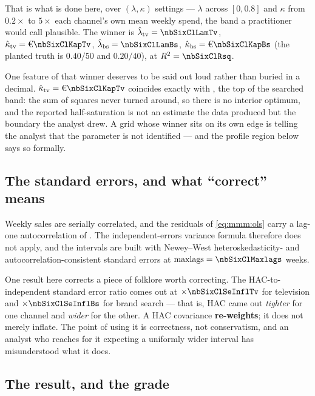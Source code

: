 That is what is done here, over \nbSixClNGrid{} $(\lambda, \kappa)$ settings --- $\lambda$ across
$[0, 0.8]$ and $\kappa$ from $0.2\times$ to $5\times$ each channel's own mean weekly spend, the
band a practitioner would call plausible. The winner is
$\hat\lambda_{\text{tv}} = \nbSixClLamTv$, $\hat\kappa_{\text{tv}} = \eur{\nbSixClKapTv}$,
$\hat\lambda_{\text{bs}} = \nbSixClLamBs$, $\hat\kappa_{\text{bs}} = \eur{\nbSixClKapBs}$
(the planted truth is $0.40 / 50$ and $0.20 / 40$), at $R^2 = \nbSixClRsq$.

One feature of that winner deserves to be said out loud rather than buried in a decimal.
$\hat\kappa_{\text{tv}} = \eur{\nbSixClKapTv}$ coincides exactly with \eur{\nbSixRegKapTvHi}, the
top of the searched band: the sum of squares never turned around, so there is no interior optimum,
and the reported half-saturation is not an estimate the data produced but the boundary the analyst
drew. A grid whose winner sits on its own edge is telling the analyst that the parameter is not
identified --- and the profile region below says so formally.

\subsection*{The standard errors, and what ``correct'' means}

Weekly sales are serially correlated, and the residuals of \cref{eq:mmm:ols} carry a lag-one
autocorrelation of \nbSixClAcfOne. The independent-errors variance formula therefore does not
apply, and the intervals are built with Newey--West heteroskedasticity- and
autocorrelation-consistent standard errors \citep{newey1987} at
$\text{maxlags} = \nbSixClMaxlags$ weeks.

One result here corrects a piece of folklore worth correcting. The HAC-to-independent standard
error ratio comes out at $\times\nbSixClSeInflTv$ for television and $\times\nbSixClSeInflBs$ for
brand search --- that is, HAC came out \emph{tighter} for one channel and \emph{wider} for the
other. A HAC covariance \textbf{re-weights}; it does not merely inflate. The point of using it is
correctness, not conservatism, and an analyst who reaches for it expecting a uniformly wider
interval has misunderstood what it does.

\subsection*{The result, and the grade}

